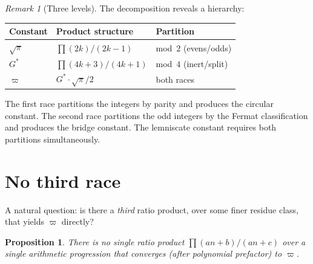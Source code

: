 \documentclass[12pt,reqno]{amsart}
\newtheorem{proposition}[theorem]{Proposition}
\theoremstyle{definition}
\theoremstyle{remark}
\newtheorem{remark}[theorem]{Remark}
\newcommand{\Gstar}{G^{\!*}}
\newcommand{\varpiup}{\varpi}
\begin{document}
\begin{remark}[Three levels]\label{rem:three-levels}
The decomposition reveals a hierarchy:
\begin{center}
\begin{tabular}{lll}
\toprule
\textbf{Constant} & \textbf{Product structure} & \textbf{Partition} \\
\midrule
$\sqrt{\pi}$ & $\prod(2k)/(2k-1)$ & mod~$2$ (evens/odds) \\
$\Gstar$   & $\prod(4k+3)/(4k+1)$ & mod~$4$ (inert/split) \\
$\varpiup$   & $\Gstar\cdot\sqrt{\pi}/2$ & both races \\
\bottomrule
\end{tabular}
\end{center}
The first race partitions the integers by parity and produces the
circular constant.  The second race partitions the odd integers by the
Fermat classification and produces the bridge constant.  The lemniscate
constant requires both partitions simultaneously.
\end{remark}


\section{No third race}

A natural question: is there a \emph{third} ratio product, over some
finer residue class, that yields $\varpiup$ directly?

\begin{proposition}\label{prop:no-third}
There is no single ratio product
$\prod(an+b)/(an+c)$ over a single arithmetic progression that
converges (after polynomial prefactor) to $\varpiup$.
\end{proposition}
\end{document}

